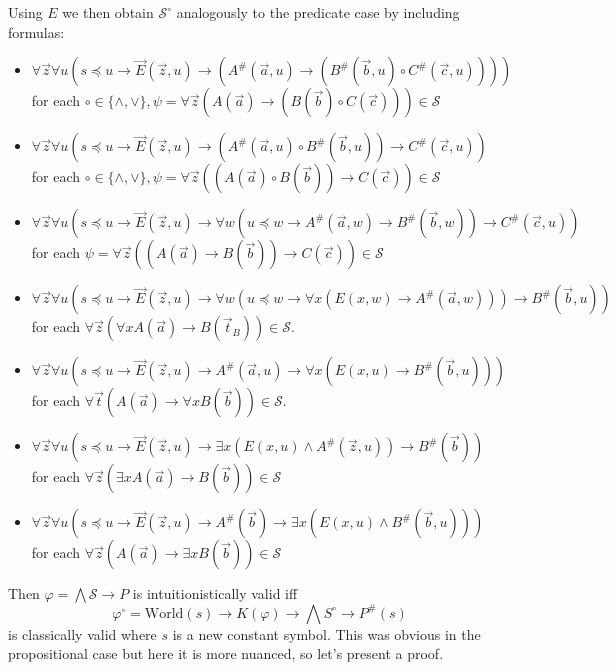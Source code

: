 \documentclass[a4paper,UKenglish,cleveref, autoref, thm-restate]{lipics-v2021}
\begin{document}
Using $E$ we then obtain $\mathcal S^\circ$ analogously to the predicate case by including formulas:

\begin{itemize}
	\item $\forall \vec z\forall u(s\preceq u\to \vec E(\vec z, u)\to (A^\#(\vec a, u)\to (B^\#(\vec b, u)\circ C^\#(\vec c, u))))$\\for each $\circ\in\{\wedge, \vee\}, \psi = \forall \vec z(A(\vec a)\to (B(\vec b)\circ C(\vec c)))\in\mathcal S$
	\item $\forall \vec z\forall u(s\preceq u\to\vec E(\vec z, u)\to (A^\#(\vec a, u)\circ B^\#(\vec b, u))\to C^\#(\vec c, u))$\\for each $\circ\in\{\wedge, \vee\}, \psi = \forall \vec z((A(\vec a)\circ B(\vec b))\to C(\vec c))\in\mathcal S$
	\item $\forall \vec z\forall u(s\preceq u\to\vec E(\vec z, u)\to\forall w(u\preceq w\to A^\#(\vec a, w)\to B^\#(\vec b, w))\to C^\#(\vec c, u))$\\ for each $\psi = \forall \vec z((A(\vec a)\to B(\vec b))\to C(\vec c))\in\mathcal S$
	\item  $\forall \vec z\forall u(s\preceq u\to\vec E(\vec z, u)\to \forall w(u\preceq w\to \forall x(E(x, w)\to A^\#(\vec a, w)))\to B^\#(\vec b, u))$\\for each $\forall \vec z(\forall xA(\vec a)\to B(\vec t_B))\in\mathcal S$.
	\item $\forall \vec z\forall u(s\preceq u\to\vec E(\vec z, u)\to A^\#(\vec a, u)\to \forall x(E(x, u)\to B^\#(\vec b, u)))$\\for each $\forall \vec t(A(\vec a)\to \forall xB(\vec b))\in\mathcal S$.
	\item $\forall \vec z\forall u(s\preceq u\to\vec E(\vec z, u)\to \exists x(E(x, u)\wedge A^\#(\vec z, u))\to B^\#(\vec b))$\\for each $\forall \vec z(\exists xA(\vec a)\to B(\vec b))\in\mathcal S$
	\item $\forall \vec z\forall u(s\preceq u\to\vec E(\vec z, u)\to A^\#(\vec b)\to \exists x(E(x, u)\wedge B^\#(\vec b, u)))$\\for each $\forall \vec z(A(\vec a)\to \exists xB(\vec b))\in\mathcal S$
\end{itemize}

Then $\varphi = \bigwedge\mathcal S\to P$ is intuitionistically valid iff
$$\varphi^\circ= \text{World}(s)\to K(\varphi)\to \bigwedge S^\circ\to P^\#(s)$$
is classically valid where $s$ is a new constant symbol. This was obvious in the propositional case but here it is more nuanced, so let's present a proof.
\end{document}
